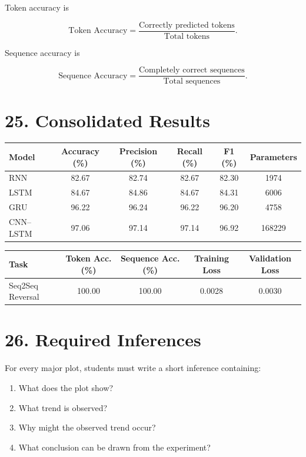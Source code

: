 \documentclass[10pt]{article}
\begin{document}
Token accuracy is

\[
\text{Token Accuracy}
=
\frac{\text{Correctly predicted tokens}}
{\text{Total tokens}}.
\]

Sequence accuracy is

\[
\text{Sequence Accuracy}
=
\frac{\text{Completely correct sequences}}
{\text{Total sequences}}.
\]
\section*{25. Consolidated Results}

\begin{center}
\begin{tabular}{|l|c|c|c|c|c|}
\hline
Model & Accuracy (\%) & Precision (\%) & Recall (\%) & F1 (\%) & Parameters\\
\hline
RNN & 82.67 & 82.74 & 82.67 & 82.30 & 1974\\
LSTM & 84.67 & 84.86 & 84.67 & 84.31 & 6006\\
GRU & 96.22 & 96.24 & 96.22 & 96.20 & 4758\\
CNN--LSTM & 97.06 & 97.14 & 97.14 & 96.92 & 168229\\
\hline
\end{tabular}
\end{center}

\begin{center}
\begin{tabular}{|l|c|c|c|c|}
\hline
Task & Token Acc. (\%) & Sequence Acc. (\%) & Training Loss & Validation Loss\\
\hline
Seq2Seq Reversal & 100.00 & 100.00 & 0.0028 & 0.0030\\
\hline
\end{tabular}
\end{center}

\section*{26. Required Inferences}

For every major plot, students must write a short inference containing:

\begin{enumerate}
\item What does the plot show?
\item What trend is observed?
\item Why might the observed trend occur?
\item What conclusion can be drawn from the experiment?
\end{enumerate}
\end{document}

